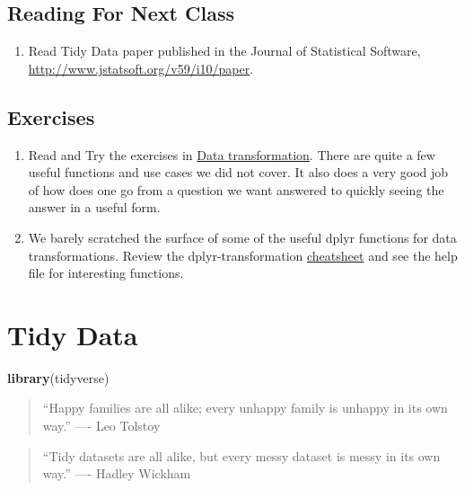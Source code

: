 \documentclass[]{book}
\newenvironment{Shaded}{\begin{snugshade}}{\end{snugshade}}
\newcommand{\KeywordTok}[1]{\textcolor[rgb]{0.13,0.29,0.53}{\textbf{#1}}}
\newcommand{\NormalTok}[1]{#1}
\providecommand{\tightlist}{%
  \setlength{\itemsep}{0pt}\setlength{\parskip}{0pt}}
\begin{document}
\section{Reading For Next Class}\label{reading-for-next-class-3}

\begin{enumerate}
\def\labelenumi{\arabic{enumi}.}
\tightlist
\item
  Read Tidy Data paper published in the Journal of Statistical Software,
  \url{http://www.jstatsoft.org/v59/i10/paper}.
\end{enumerate}

\section{Exercises}\label{exercises-3}

\begin{enumerate}
\def\labelenumi{\arabic{enumi}.}
\item
  Read and Try the exercises in
  \href{https://r4ds.had.co.nz/transform.html}{Data transformation}.
  There are quite a few useful functions and use cases we did not cover.
  It also does a very good job of how does one go from a question we
  want answered to quickly seeing the answer in a useful form.
\item
  We barely scratched the surface of some of the useful dplyr functions
  for data transformations. Review the dplyr-transformation
  \href{https://www.rstudio.com/resources/cheatsheets/\#dplyr}{cheatsheet}
  and see the help file for interesting functions.
\end{enumerate}

\chapter{Tidy Data}\label{tidy-data}

\begin{Shaded}
\begin{Highlighting}[]
\KeywordTok{library}\NormalTok{(tidyverse)}
\end{Highlighting}
\end{Shaded}

\begin{quote}
``Happy families are all alike; every unhappy family is unhappy in its
own way.'' ---- Leo Tolstoy
\end{quote}

\begin{quote}
``Tidy datasets are all alike, but every messy dataset is messy in its
own way.'' ---- Hadley Wickham
\end{quote}
\end{document}
